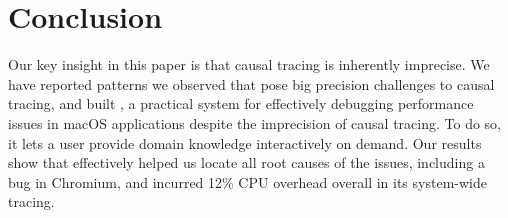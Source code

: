 \section{Conclusion} \label{sec:conclusion}
Our key insight in this paper is that causal tracing is inherently
imprecise. We have reported patterns we observed that pose big precision
challenges to causal tracing, and built \xxx, a practical system for
effectively debugging performance issues in macOS applications despite the
imprecision of causal tracing.  To do so, it lets a user provide domain
knowledge interactively on demand. Our results show that \xxx effectively
helped us locate all root causes of the issues, including a bug in Chromium,
 and incurred 12\% CPU overhead overall in its system-wide tracing.